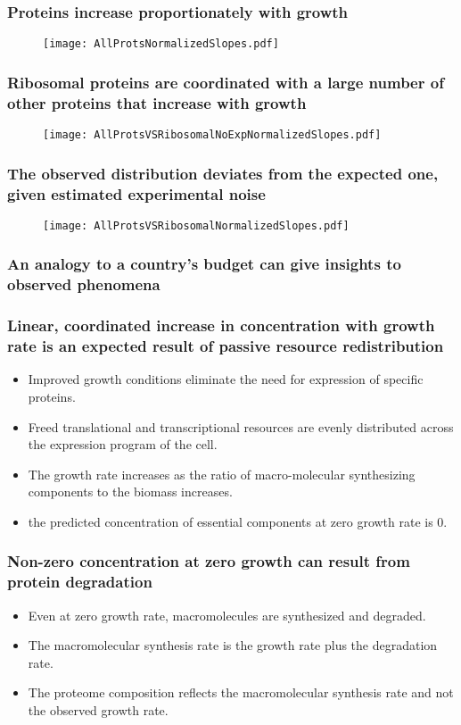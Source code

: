\documentclass{beamer}
\begin{document}
\begin{frame}
\frametitle{Proteins increase proportionately with growth}
\begin{figure}[h!]
\centering
\texttt{[image: AllProtsNormalizedSlopes.pdf]}
\end{figure}
\end{frame}

\begin{frame}
\frametitle{Ribosomal proteins are coordinated with a large number of other proteins that increase with growth}
\begin{figure}[h!]
\centering
\texttt{[image: AllProtsVSRibosomalNoExpNormalizedSlopes.pdf]}
\end{figure}
\end{frame}

\begin{frame}
\frametitle{The observed distribution deviates from the expected one, given estimated experimental noise}
\begin{figure}[h!]
\centering
\texttt{[image: AllProtsVSRibosomalNormalizedSlopes.pdf]}
\end{figure}
\end{frame}

\begin{frame}
\frametitle{An analogy to a country's budget can give insights to observed phenomena}
\end{frame}

\begin{frame}
\frametitle{Linear, coordinated increase in concentration with growth rate is an expected result of passive resource redistribution}
\begin{itemize}
\item Improved growth conditions eliminate the need for expression of specific proteins.
\item Freed translational and transcriptional resources are evenly distributed across the expression program of the cell.
\item The growth rate increases as the ratio of macro-molecular synthesizing components to the biomass increases.
\item the predicted concentration of essential components at zero growth rate is 0.
\end{itemize}
\end{frame}

\begin{frame}
\frametitle{Non-zero concentration at zero growth can result from protein degradation}
\begin{itemize}
\item Even at zero growth rate, macromolecules are synthesized and degraded.
\item The macromolecular synthesis rate is the growth rate plus the degradation rate.
\item The proteome composition reflects the macromolecular synthesis rate and not the observed growth rate.
\end{itemize}
\end{frame}
\end{document}
